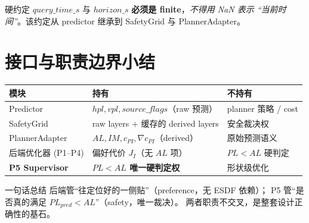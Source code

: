 \documentclass[11pt]{ctexart}
\begin{document}
\begin{warnbox}{硬约定}
$query\_time\_s$ 与 $horizon\_s$ \textbf{必须是 finite}，\emph{不得用 NaN 表示
``当前时间''}。该约定从 predictor 继承到 SafetyGrid 与 PlannerAdapter。
\end{warnbox}

\section{接口与职责边界小结}
\begin{center}\renewcommand{\arraystretch}{1.3}
\begin{tabular}{@{}lll@{}}
\toprule
模块 & 持有 & 不持有\\
\midrule
Predictor & $hpl,vpl,source\_flags$（raw 预测） & planner 策略 / cost\\
SafetyGrid & raw layers + 缓存的 derived layers & 安全裁决权\\
PlannerAdapter & $AL,IM,c_{PI},\nabla c_{PI}$（derived） & 原始预测语义\\
后端优化器 (P1--P4) & 偏好代价 $J_I$（无 $AL$ 项） & $PL<AL$ 硬判定\\
\textbf{P5 Supervisor} & \textbf{$PL<AL$ 唯一硬判定权} & 形状级优化\\
\bottomrule
\end{tabular}\end{center}

\bigskip
\begin{notebox}{一句话总结}
后端管``往定位好的一侧贴''（preference，无 ESDF 依赖）；
P5 管``是否真的满足 $PL_{pred}<AL$''（safety，唯一裁决）。
两者职责不交叉，是整套设计正确性的基石。
\end{notebox}
\end{document}
